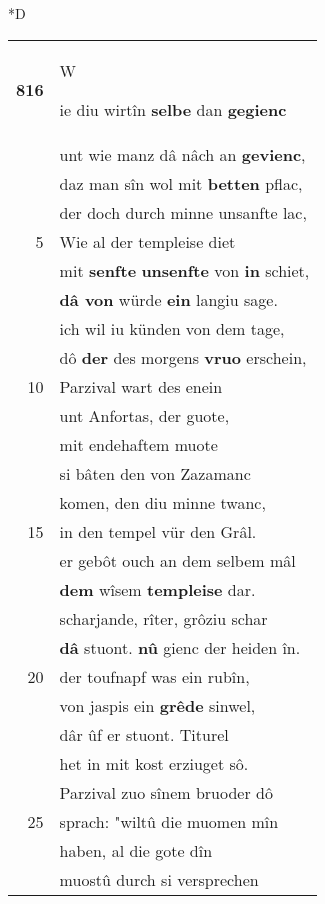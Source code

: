 \documentclass[8pt,a4paper,notitlepage]{article}
\begin{document}
\begin{table}[ht]
\begin{minipage}[t]{0.5\linewidth}
\small
\begin{center}*D
\end{center}
\begin{tabular}{rl}
\textbf{816} & \begin{large}W\end{large}ie diu wirtîn \textbf{selbe} dan \textbf{gegienc}\\ 
 & unt wie manz dâ nâch an \textbf{gevienc},\\ 
 & daz man sîn wol mit \textbf{betten} pflac,\\ 
 & der doch durch minne unsanfte lac,\\ 
5 & Wie al der templeise diet\\ 
 & mit \textbf{senfte} \textbf{unsenfte} von \textbf{in} schiet,\\ 
 & \textbf{dâ von} würde \textbf{ein} langiu sage.\\ 
 & ich wil iu künden von dem tage,\\ 
 & dô \textbf{der} des morgens \textbf{vruo} erschein,\\ 
10 & Parzival wart des enein\\ 
 & unt Anfortas, der guote,\\ 
 & mit endehaftem muote\\ 
 & si bâten den von Zazamanc\\ 
 & komen, den diu minne twanc,\\ 
15 & in den tempel vür den Grâl.\\ 
 & er gebôt ouch an dem selbem mâl\\ 
 & \textbf{dem} wîsem \textbf{templeise} dar.\\ 
 & scharjande, rîter, grôziu schar\\ 
 & \textbf{dâ} stuont. \textbf{nû} gienc der heiden în.\\ 
20 & der toufnapf was ein rubîn,\\ 
 & von jaspis ein \textbf{grêde} sinwel,\\ 
 & dâr ûf er stuont. Titurel\\ 
 & het in mit kost erziuget sô.\\ 
 & Parzival zuo sînem bruoder dô\\ 
25 & sprach: "wiltû die muomen mîn\\ 
 & haben, al die gote dîn\\ 
 & muostû durch si versprechen\\ 

\end{tabular}
\end{minipage}
\end{table}
\end{document}
